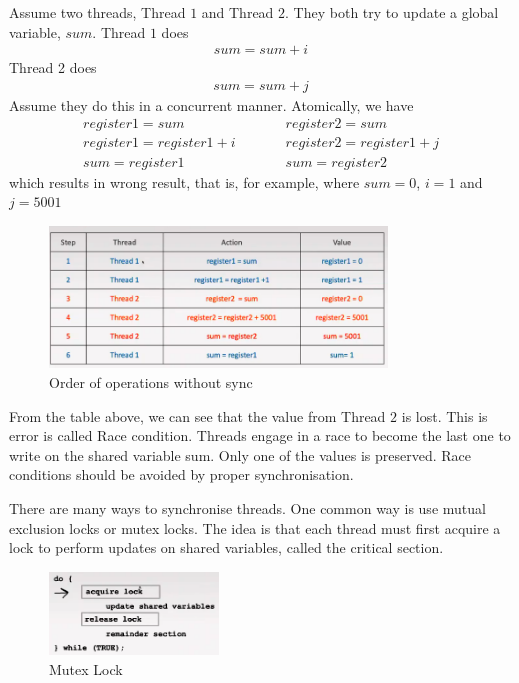 \documentclass[a4paper]{article}
\theoremstyle{plain}
\theoremstyle{definition}
\newtheorem{defn}{Definition}[section]
\newtheorem{exmp}{Example}[section]
\theoremstyle{remark}
\begin{document}
\begin{tcolorbox}[colback=black!3!white,colframe=black!60!white,title=\begin{exmp}Thread Sync \label{Thread Sync}\end{exmp}]
        Assume two threads, Thread $1$ and Thread $2 $. They both try to update a global variable, $sum$. Thread $1$ does
	\begin{align*}
		sum=sum+i
	\end{align*}
	Thread 2 does
	\begin{align*}
		sum=sum+j
	\end{align*}
Assume they do this in a concurrent manner. Atomically, we have
\begin{align*}
	register 1 = sum \;\;\;\;\;&\;\;\;\;\; register 2 = sum \\
	register 1 = register 1 + i \;\;\;\;\; & \;\;\;\;\;register 2 = register 1 + j \\
	sum = register 1 \;\;\;\;\;&\;\;\;\;\; sum = register 2 
\end{align*}
which results in wrong result, that is, for example, where $sum=0$, $i=1$ and $j=5001$
\begin{figure}[H]
	\centering
	\includegraphics[width=0.8\textwidth]{twentynine.png}
	\caption{Order of operations without sync}
	\label{fig:twentynine-png}
\end{figure}
From the table above, we can see that the value from Thread $2$ is lost. This is error is called Race condition. Threads engage in a race to become the last one to write on the shared variable sum. Only one of the values is preserved. Race conditions should be avoided by proper synchronisation.
\end{tcolorbox}
\begin{tcolorbox}[colback=black!3!white,colframe=black!60!white,title=\begin{defn}Mutex Locks \label{Mutex Locks}\end{defn}]
There are many ways to synchronise threads. One common way is use mutual exclusion locks or mutex locks. The idea is that each thread must first acquire a lock to perform updates on shared variables, called the critical section. 
\begin{figure}[H]
	\centering
	\includegraphics[width=0.4\textwidth]{thirty.png}
	\caption{Mutex Lock}
	\label{fig:thirty-png}
\end{figure}
\end{tcolorbox}
\end{document}
